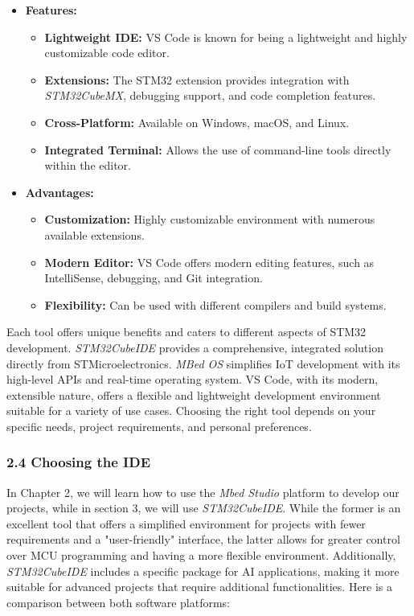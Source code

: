 \documentclass[10pt,a4paper,onecolumn]{article}
\begin{document}
\begin{itemize}
  \item \textbf{Features:}
    \begin{itemize}
      \item \textbf{Lightweight IDE:} VS Code is known for being a lightweight and highly customizable code editor.
      \item \textbf{Extensions:} The STM32 extension provides integration with \textit{STM32CubeMX}, debugging support, and code completion features.
      \item \textbf{Cross-Platform:} Available on Windows, macOS, and Linux.
      \item \textbf{Integrated Terminal:} Allows the use of command-line tools directly within the editor.
    \end{itemize}
  \item \textbf{Advantages:}
    \begin{itemize}
      \item \textbf{Customization:} Highly customizable environment with numerous available extensions.
      \item \textbf{Modern Editor:} VS Code offers modern editing features, such as IntelliSense, debugging, and Git integration.
      \item \textbf{Flexibility:} Can be used with different compilers and build systems.
    \end{itemize}
\end{itemize}

Each tool offers unique benefits and caters to different aspects of STM32 development. \textit{STM32CubeIDE} provides a comprehensive, integrated solution directly from STMicroelectronics. \textit{MBed OS} simplifies IoT development with its high-level APIs and real-time operating system. VS Code, with its modern, extensible nature, offers a flexible and lightweight development environment suitable for a variety of use cases. Choosing the right tool depends on your specific needs, project requirements, and personal preferences.

\hypertarget{choosing-the-ide}{%
\subsubsection{2.4 Choosing the IDE}\label{choosing-the-ide}}

In Chapter 2, we will learn how to use the \textit{Mbed Studio} platform to develop our projects, while in section 3, we will use \textit{STM32CubeIDE}. While the former is an excellent tool that offers a simplified environment for projects with fewer requirements and a "user-friendly" interface, the latter allows for greater control over MCU programming and having a more flexible environment. Additionally, \textit{STM32CubeIDE} includes a specific package for AI applications, making it more suitable for advanced projects that require additional functionalities. Here is a comparison between both software platforms:
\end{document}
